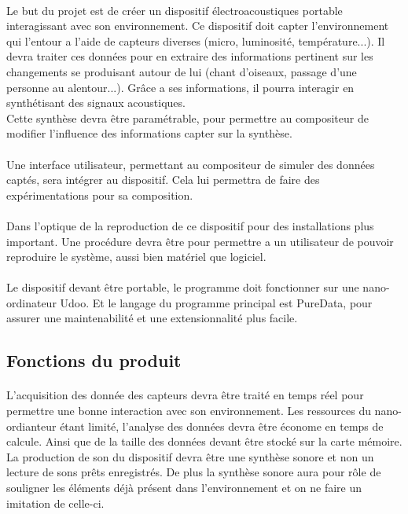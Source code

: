 \documentclass[a4paper, titlepage, oneside, 12pt]{article}%
\begin{document}
\paragraph{}
Le but du projet est de créer un dispositif électroacoustiques portable interagissant avec son environnement.
Ce dispositif doit capter l'environnement qui l'entour a l'aide de capteurs diverses (micro, luminosité, température...). Il devra traiter ces données pour en extraire des informations pertinent sur les changements se produisant autour de lui (chant d'oiseaux, passage d'une personne au alentour...).
Grâce a ses informations, il pourra interagir en synthétisant des signaux acoustiques. \\
Cette synthèse devra être paramétrable, pour permettre au compositeur de modifier l’influence des informations capter sur la synthèse.

\paragraph{}
Une interface utilisateur, permettant au compositeur de simuler des données captés, sera intégrer au dispositif. Cela lui permettra de faire des expérimentations pour sa composition.

\paragraph{}
Dans l'optique de la reproduction de ce dispositif pour des installations plus important. Une procédure devra être pour permettre a un utilisateur de pouvoir reproduire le système, aussi bien matériel que logiciel.

\paragraph{}
Le dispositif devant être portable, le programme doit fonctionner sur une nano-ordinateur Udoo. Et le langage du programme principal est PureData, pour assurer une maintenabilité et une extensionnalité plus facile.



\subsection{Fonctions du produit}
\paragraph{}
L’acquisition des donnée des capteurs devra être traité en temps réel pour permettre une bonne interaction avec son environnement. Les ressources du nano-ordianteur étant limité, l'analyse des données devra être économe en temps de calcule. Ainsi que de la taille des données devant être stocké sur la carte mémoire.\\
La production de son du dispositif devra être une synthèse sonore et non un lecture de sons prêts enregistrés. De plus la synthèse sonore aura pour rôle de souligner les éléments déjà présent dans l’environnement  et on ne faire un imitation de celle-ci.
\end{document}
